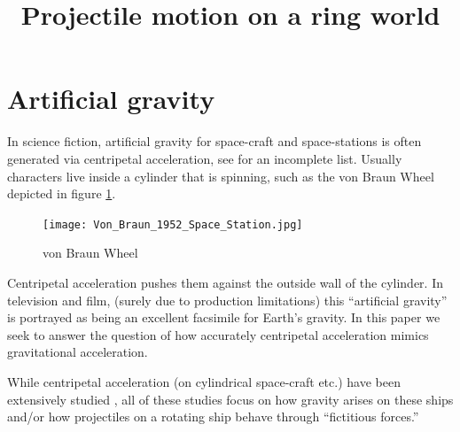 \documentclass{amsart}
\title{Projectile motion on a ring world}
\theoremstyle{definition}
\begin{document}
\maketitle

\section{Artificial gravity}

In science fiction, artificial gravity for space-craft and
space-stations is often generated via centripetal acceleration, see
\cite{2001,2010,missiontomars,themartian,expanse,babylon5,europareport,ringworld?,rama,intersetller,etc}
for an incomplete list. Usually characters live inside a cylinder that
is spinning, such as the von Braun Wheel depicted in figure
\ref{fig:Braun Wheel}.

\begin{figure}[h]
  \centering
  \texttt{[image: Von\_Braun\_1952\_Space\_Station.jpg]}
  \caption{von Braun Wheel}
  \label{fig:Braun Wheel}
\end{figure}

Centripetal acceleration pushes them against the outside wall of the
cylinder. In television and film, (surely due to production
limitations) this ``artificial gravity'' is portrayed as being an
excellent facsimile for Earth's gravity. In this paper we seek to
answer the question of how accurately centripetal acceleration mimics
gravitational acceleration.


While centripetal acceleration (on cylindrical space-craft etc.) have
been extensively studied \cite{papers,anotherpaper}, all of these
studies focus on how gravity arises on these ships and/or how projectiles on 
a rotating ship behave through ``fictitious forces.''
\end{document}

